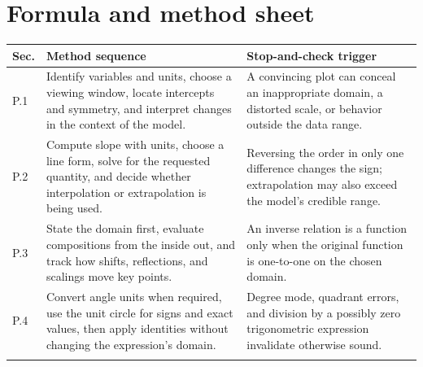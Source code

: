 \documentclass[11pt]{article}
\begin{document}
\section{Formula and method sheet}
\small
\begin{longtable}{@{}>{\RaggedRight\arraybackslash}p{}>{\RaggedRight\arraybackslash}p{}>{\RaggedRight\arraybackslash}p{}@{}}
\toprule
\textbf{Sec.} & \textbf{Method sequence} & \textbf{Stop-and-check trigger}\\
\midrule\endhead
P.1 & Identify variables and units, choose a viewing window, locate intercepts and symmetry, and interpret changes in the context of the model. & A convincing plot can conceal an inappropriate domain, a distorted scale, or behavior outside the data range. \\\addlinespace[2pt]
P.2 & Compute slope with units, choose a line form, solve for the requested quantity, and decide whether interpolation or extrapolation is being used. & Reversing the order in only one difference changes the sign; extrapolation may also exceed the model's credible range. \\\addlinespace[2pt]
P.3 & State the domain first, evaluate compositions from the inside out, and track how shifts, reflections, and scalings move key points. & An inverse relation is a function only when the original function is one-to-one on the chosen domain. \\\addlinespace[2pt]
P.4 & Convert angle units when required, use the unit circle for signs and exact values, then apply identities without changing the expression's domain. & Degree mode, quadrant errors, and division by a possibly zero trigonometric expression invalidate otherwise sound. \\\addlinespace[2pt]
\bottomrule
\end{longtable}
\normalsize
\end{document}
